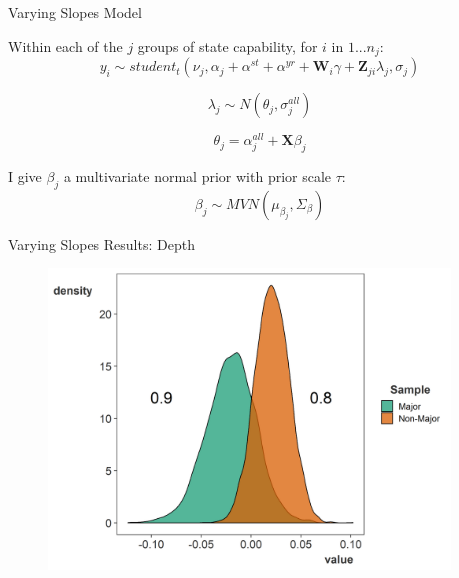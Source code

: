 \documentclass[12pt]{beamer}
\begin{document}

\begin{frame}{Varying Slopes Model}

Within each of the $j$ groups of state capability, for $i$ in $1 ... n_j$: 
\begin{equation*}
y_i \sim student_t(\nu_j, \alpha_j + \alpha^{st} + \alpha^{yr} +\textbf{W}_{i} \gamma  + \textbf{Z}_{ji} \lambda_{j}, \sigma_j) 
\end{equation*} 

\begin{equation*}
\lambda_{j} \sim N(\theta_{j}, \sigma^{all}_{j})
\end{equation*} 

\begin{equation*}
\theta_{j} = \alpha^{all}_{j} + \textbf{X} \beta_j
\end{equation*}

I give $\beta_j$ a multivariate normal prior with prior scale $\tau$:
\begin{equation*}
\beta_j \sim MVN(\mu_{\beta_j}, \Sigma_{\beta}) 
\end{equation*}

\end{frame}



\begin{frame}{Varying Slopes Results: Depth}

\begin{figure}[htbp]
	\centering
		\includegraphics[width=0.95\textwidth]{var-slopes-depth.png}
\end{figure}

\end{frame}
\end{document}
